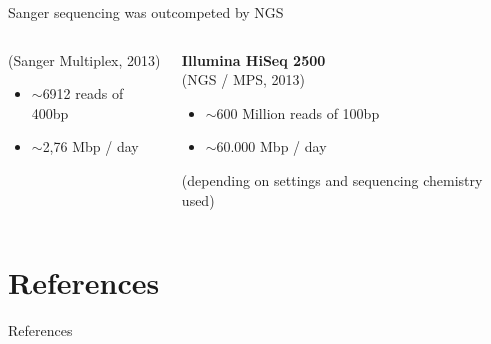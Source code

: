 \documentclass[10pt]{beamer}
\begin{document}
\begin{frame}{Sanger sequencing was outcompeted by NGS}
\begin{columns}[T,onlytextwidth]
\begin{exampleblock}{}
			(Sanger Multiplex, 2013)
			\begin{itemize}
				\item $\sim$6912 reads of 400bp
				\item $\sim$2,76 Mbp / day
			\end{itemize}
		\end{exampleblock}
		\begin{exampleblock}{}
			\textbf{Illumina HiSeq 2500}  \vspace{0.3em} \\
			(NGS / MPS, 2013)
			\begin{itemize}
				\item $\sim$600 Million reads of 100bp
				\item $\sim$60.000 Mbp / day
			\end{itemize}
			{ \small (depending on settings and sequencing chemistry used)}
		\end{exampleblock}
	\end{columns}
\end{frame}

\section{References}
\begin{frame}[allowframebreaks]{References}
\begingroup
\renewcommand*{\bibfont}{\footnotesize} 
\printbibliography[heading=none]
\endgroup
\end{frame}
\end{document}
